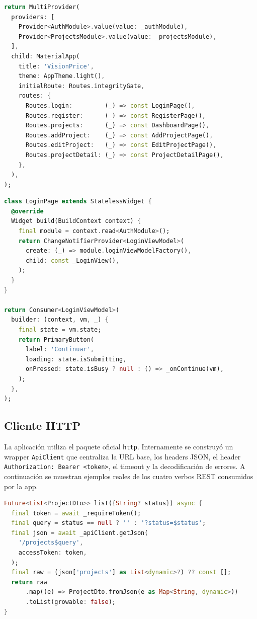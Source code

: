 \documentclass[12pt, a4paper]{article} %
\begin{document}
\begin{lstlisting}[language=Dart, caption={Composition root global con MultiProvider}]
return MultiProvider(
  providers: [
    Provider<AuthModule>.value(value: _authModule),
    Provider<ProjectsModule>.value(value: _projectsModule),
  ],
  child: MaterialApp(
    title: 'VisionPrice',
    theme: AppTheme.light(),
    initialRoute: Routes.integrityGate,
    routes: {
      Routes.login:         (_) => const LoginPage(),
      Routes.register:      (_) => const RegisterPage(),
      Routes.projects:      (_) => const DashboardPage(),
      Routes.addProject:    (_) => const AddProjectPage(),
      Routes.editProject:   (_) => const EditProjectPage(),
      Routes.projectDetail: (_) => const ProjectDetailPage(),
    },
  ),
);
\end{lstlisting}

\begin{lstlisting}[language=Dart, caption={ChangeNotifierProvider + Consumer en la página}]
class LoginPage extends StatelessWidget {
  @override
  Widget build(BuildContext context) {
    final module = context.read<AuthModule>();
    return ChangeNotifierProvider<LoginViewModel>(
      create: (_) => module.loginViewModelFactory(),
      child: const _LoginView(),
    );
  }
}

return Consumer<LoginViewModel>(
  builder: (context, vm, _) {
    final state = vm.state;
    return PrimaryButton(
      label: 'Continuar',
      loading: state.isSubmitting,
      onPressed: state.isBusy ? null : () => _onContinue(vm),
    );
  },
);
\end{lstlisting}

\subsection{Cliente HTTP}
\label{sec:http}
La aplicación utiliza el paquete oficial \texttt{http}. Internamente se
construyó un wrapper \texttt{ApiClient} que centraliza la URL base, los
headers JSON, el header \texttt{Authorization: Bearer <token>}, el
timeout y la decodificación de errores. A continuación se muestran
ejemplos reales de los cuatro verbos REST consumidos por la app.

\begin{lstlisting}[language=Dart, caption={GET /projects: listar proyectos}]
Future<List<ProjectDto>> list({String? status}) async {
  final token = await _requireToken();
  final query = status == null ? '' : '?status=$status';
  final json = await _apiClient.getJson(
    '/projects$query',
    accessToken: token,
  );
  final raw = (json['projects'] as List<dynamic>?) ?? const [];
  return raw
      .map((e) => ProjectDto.fromJson(e as Map<String, dynamic>))
      .toList(growable: false);
}
\end{lstlisting}
\end{document}
